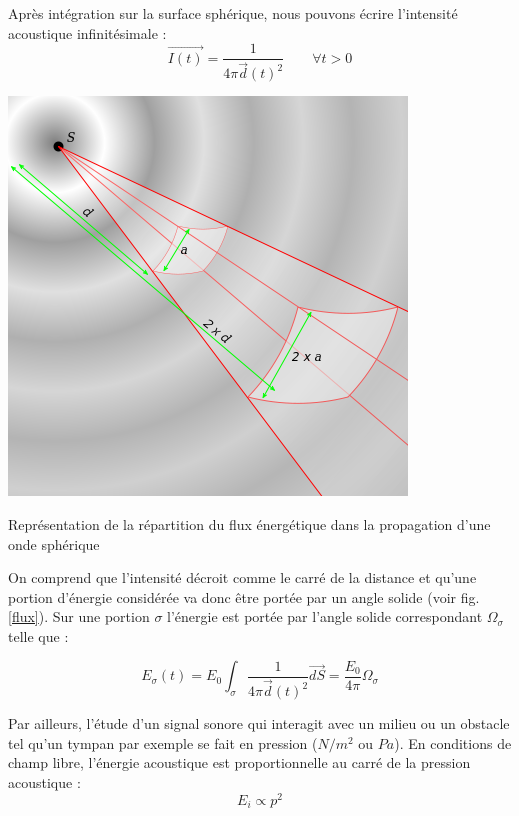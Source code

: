 Après intégration sur la surface sphérique, nous pouvons écrire l'intensité acoustique infinitésimale :
\begin{equation} 
 \overrightarrow{I(t)} = \frac{1}{4\pi  \overrightarrow{d}(t)^2} \qquad \forall t > 0
\end{equation}

\begin{figureth}
	\includegraphics[width=0.5\linewidth]{images/flux}
	\caption{Représentation de la répartition du flux énergétique dans la propagation d'une onde sphérique}
	\label{flux}
\end{figureth}

On comprend que l'intensité décroit comme le carré de la distance et qu'une portion d'énergie considérée va donc être portée par un angle solide (voir fig. \ref{flux}). Sur une portion $\sigma$ l'énergie est portée par l'angle solide correspondant $\Omega_{\sigma}$ telle que :

\begin{equation} \label{eq_energie}
E_{\sigma}(t) = E_0 \int_{\sigma}  \frac{1}{4\pi  \overrightarrow{d}(t)^2} \overrightarrow{dS} = \frac{E_0}{4\pi}  \Omega_{\sigma}
\end{equation}


Par ailleurs, l'étude d'un signal sonore qui interagit avec un milieu ou un obstacle tel qu'un tympan par exemple se fait en pression ($N/m^2$ ou $Pa$). En conditions de champ libre, l'énergie acoustique est proportionnelle au carré de la pression acoustique :
\begin{equation} 
E_i \propto p^2
\end{equation}



